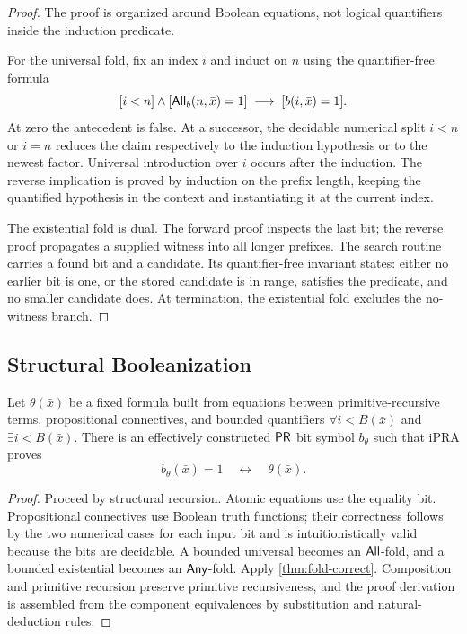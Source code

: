 \begin{proof}
The proof is organized around Boolean equations, not logical quantifiers inside
the induction predicate.

For the universal fold, fix an index \(i\) and induct on \(n\) using the
quantifier-free formula
\[
  [i<n]\wedge [\mathsf{All}_b(n,\bar x)=1]
  \;\longrightarrow\;[b(i,\bar x)=1].
\]
At zero the antecedent is false.  At a successor, the decidable numerical split
\(i<n\) or \(i=n\) reduces the claim respectively to the induction hypothesis
or to the newest factor.  Universal introduction over \(i\) occurs after the
induction.  The reverse implication is proved by induction on the prefix
length, keeping the quantified hypothesis in the context and instantiating it
at the current index.

The existential fold is dual.  The forward proof inspects the last bit; the
reverse proof propagates a supplied witness into all longer prefixes.  The
search routine carries a found bit and a candidate.  Its quantifier-free
invariant states: either no earlier bit is one, or the stored candidate is in
range, satisfies the predicate, and no smaller candidate does.  At termination,
the existential fold excludes the no-witness branch.
\end{proof}

\subsection{Structural Booleanization}

\begin{theorem}
\label{thm:booleanization}
Let \(\theta(\bar x)\) be a fixed formula built from equations between
primitive-recursive terms, propositional connectives, and bounded quantifiers
\(\forall i<B(\bar x)\) and \(\exists i<B(\bar x)\).  There is an effectively
constructed \(\mathsf{PR}\) bit symbol \(b_\theta\) such that iPRA proves
\[
 b_\theta(\bar x)=1\quad\leftrightarrow\quad\theta(\bar x).
\]
\end{theorem}

\begin{proof}
Proceed by structural recursion.  Atomic equations use the equality bit.
Propositional connectives use Boolean truth functions; their correctness follows
by the two numerical cases for each input bit and is intuitionistically valid
because the bits are decidable.  A bounded universal becomes an \(\mathsf{All}\)-fold,
and a bounded existential becomes an \(\mathsf{Any}\)-fold.  Apply
\cref{thm:fold-correct}.  Composition and primitive recursion preserve
primitive recursiveness, and the proof derivation is assembled from the
component equivalences by substitution and natural-deduction rules.
\end{proof}

